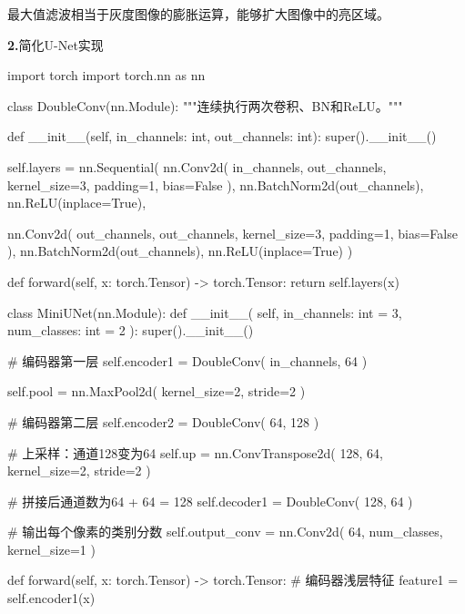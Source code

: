 \documentclass[UTF8,openany,oneside,zihao=-4,fontset=windows]{ctexbook}
\newcommand{\Question}[2]{%
  \par\Needspace{4\baselineskip}\medskip
  \noindent\textbf{\color{MVBlue}#1}\quad #2\par
}
\begin{document}
\par 最大值滤波相当于灰度图像的膨胀运算，能够扩大图像中的亮区域。
\Question{2.}{简化U-Net实现}
\begin{CodeBlock}
import torch
import torch.nn as nn

class DoubleConv(nn.Module):
    """连续执行两次卷积、BN和ReLU。"""

    def __init__(self, in_channels: int, out_channels: int):
        super().__init__()

        self.layers = nn.Sequential(
            nn.Conv2d(
                in_channels,
                out_channels,
                kernel_size=3,
                padding=1,
                bias=False
            ),
            nn.BatchNorm2d(out_channels),
            nn.ReLU(inplace=True),

            nn.Conv2d(
                out_channels,
                out_channels,
                kernel_size=3,
                padding=1,
                bias=False
            ),
            nn.BatchNorm2d(out_channels),
            nn.ReLU(inplace=True)
        )

    def forward(self, x: torch.Tensor) -> torch.Tensor:
        return self.layers(x)

class MiniUNet(nn.Module):
    def __init__(
        self,
        in_channels: int = 3,
        num_classes: int = 2
    ):
        super().__init__()

        # 编码器第一层
        self.encoder1 = DoubleConv(
            in_channels,
            64
        )

        self.pool = nn.MaxPool2d(
            kernel_size=2,
            stride=2
        )

        # 编码器第二层
        self.encoder2 = DoubleConv(
            64,
            128
        )

        # 上采样：通道128变为64
        self.up = nn.ConvTranspose2d(
            128,
            64,
            kernel_size=2,
            stride=2
        )

        # 拼接后通道数为64 + 64 = 128
        self.decoder1 = DoubleConv(
            128,
            64
        )

        # 输出每个像素的类别分数
        self.output_conv = nn.Conv2d(
            64,
            num_classes,
            kernel_size=1
        )

    def forward(self, x: torch.Tensor) -> torch.Tensor:
        # 编码器浅层特征
        feature1 = self.encoder1(x)


\end{CodeBlock}
\end{document}
